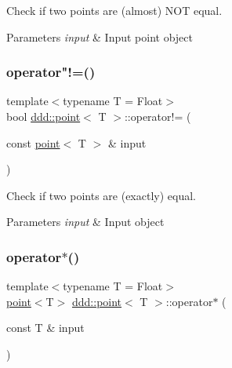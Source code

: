 Check if two points are (almost) N\+OT equal. 


\begin{DoxyParams}{Parameters}
{\em input} & Input point object \\
\hline
\end{DoxyParams}
\mbox{\label{classddd_1_1point_a2567b8c3cd08d965e70033f3f4a8d3db}} 
\subsubsection{\texorpdfstring{operator"!=()}{operator!=()}}
{\footnotesize\ttfamily template$<$typename T = Float$>$ \\
bool \hyperlink{classddd_1_1point}{ddd\+::point}$<$ T $>$\+::operator!= (\begin{DoxyParamCaption}\item[{const \hyperlink{classddd_1_1point}{point}$<$ T $>$ \&}]{input }\end{DoxyParamCaption})\hspace{0.3cm}{\ttfamily [inline]}}



Check if two points are (exactly) equal. 


\begin{DoxyParams}{Parameters}
{\em input} & Input object \\
\hline
\end{DoxyParams}
\mbox{\label{classddd_1_1point_a4291cf7411bd02324731a13143d718c6}} 
\subsubsection{\texorpdfstring{operator$\ast$()}{operator*()}}
{\footnotesize\ttfamily template$<$typename T = Float$>$ \\
\hyperlink{classddd_1_1point}{point}$<$T$>$ \hyperlink{classddd_1_1point}{ddd\+::point}$<$ T $>$\+::operator$\ast$ (\begin{DoxyParamCaption}\item[{const T \&}]{input }\end{DoxyParamCaption})\hspace{0.3cm}{\ttfamily [inline]}}




